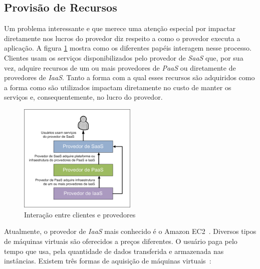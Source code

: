 \documentclass[a4paper,titlepage,12pt]{article}
\begin{document}
\subsection{Provisão de Recursos}

Um problema interessante e que merece uma atenção especial por impactar diretamente nos lucros do provedor diz respeito a como o provedor executa a aplicação. A figura \ref{figura:saas-layers} mostra como os diferentes papéis interagem nesse processo. Clientes usam os serviços disponibilizados pelo provedor de \textit{SaaS} que, por sua vez, adquire recursos de um ou mais provedores de \textit{PaaS} ou diretamente de provedores de \textit{IaaS}. Tanto a forma com a qual esses recursos são adquiridos como a forma como são utilizados impactam diretamente no custo de manter os serviços e, consequentemente, no lucro do provedor. 

\begin{figure}[htp]
\begin{center}
  \includegraphics[width=0.5\textwidth]{figures/saas-layers.png}
  \caption[Interação entre clientes e provedores]{Interação entre clientes e provedores}
  \label{figura:saas-layers}
\end{center}
\end{figure}

Atualmente, o provedor de \textit{IaaS} mais conhecido é o Amazon EC2~\cite{amazon-ec2}. Diversos tipos de máquinas virtuais são oferecidos a preços diferentes. O usuário paga pelo tempo que usa, pela quantidade de dados transferida e armazenada nas instâncias. Existem três formas de aquisição de máquinas virtuais~\cite{amazon-pricing}:
\end{document}
